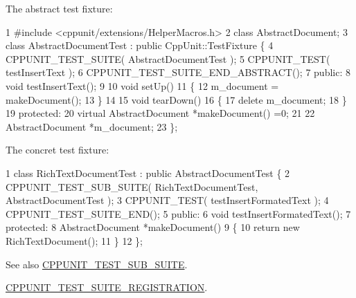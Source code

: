 The abstract test fixture\+: 
\begin{DoxyCode}
1 #include <cppunit/extensions/HelperMacros.h>
2 class AbstractDocument;
3 class AbstractDocumentTest : public CppUnit::TestFixture \{
4   CPPUNIT\_TEST\_SUITE( AbstractDocumentTest );
5   CPPUNIT\_TEST( testInsertText );
6   CPPUNIT\_TEST\_SUITE\_END\_ABSTRACT();
7 public:
8   void testInsertText();
9 
10   void setUp()
11   \{
12     m\_document = makeDocument();
13   \}
14 
15   void tearDown()
16   \{
17     delete m\_document;
18   \}
19 protected:
20   virtual AbstractDocument *makeDocument() =0;
21 
22   AbstractDocument *m\_document;
23 \};
\end{DoxyCode}


The concret test fixture\+: 
\begin{DoxyCode}
1 class RichTextDocumentTest : public AbstractDocumentTest \{
2   CPPUNIT\_TEST\_SUB\_SUITE( RichTextDocumentTest, AbstractDocumentTest );
3   CPPUNIT\_TEST( testInsertFormatedText );
4   CPPUNIT\_TEST\_SUITE\_END();
5 public:
6   void testInsertFormatedText();
7 protected:
8   AbstractDocument *makeDocument()
9   \{
10     return new RichTextDocument();
11   \}
12 \};
\end{DoxyCode}


\begin{DoxySeeAlso}{See also}
\hyperlink{group___writing_test_fixture_gae19f30ade82172cf6c3ff297367a10c2}{C\+P\+P\+U\+N\+I\+T\+\_\+\+T\+E\+S\+T\+\_\+\+S\+U\+B\+\_\+\+S\+U\+I\+TE}. 

\hyperlink{_helper_macros_8h_a70f00cc9f589d24019ee9efee4de2d74}{C\+P\+P\+U\+N\+I\+T\+\_\+\+T\+E\+S\+T\+\_\+\+S\+U\+I\+T\+E\+\_\+\+R\+E\+G\+I\+S\+T\+R\+A\+T\+I\+ON}. 
\end{DoxySeeAlso}
